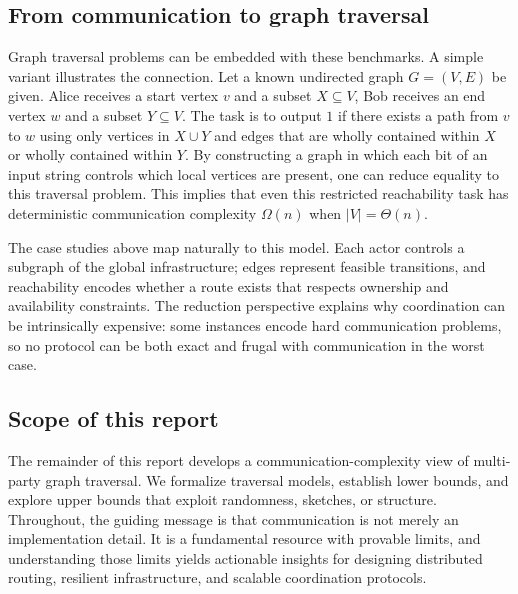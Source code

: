 \subsection{From communication to graph traversal}
Graph traversal problems can be embedded with these benchmarks. A simple variant illustrates the connection. Let a known undirected graph $G=(V,E)$ be given. Alice receives a start vertex $v$ and a subset $X\subseteq V$, Bob receives an end vertex $w$ and a subset $Y\subseteq V$. The task is to output $1$ if there exists a path from $v$ to $w$ using only vertices in $X\cup Y$ and edges that are wholly contained within $X$ or wholly contained within $Y$. By constructing a graph in which each bit of an input string controls which local vertices are present, one can reduce equality to this traversal problem. This implies that even this restricted reachability task has deterministic communication complexity $\Omega(n)$ when $|V|=\Theta(n)$.

The case studies above map naturally to this model. Each actor controls a subgraph of the global infrastructure; edges represent feasible transitions, and reachability encodes whether a route exists that respects ownership and availability constraints. The reduction perspective explains why coordination can be intrinsically expensive: some instances encode hard communication problems, so no protocol can be both exact and frugal with communication in the worst case.

\subsection{Scope of this report}
The remainder of this report develops a communication-complexity view of multi-party graph traversal. We formalize traversal models, establish lower bounds, and explore upper bounds that exploit randomness, sketches, or structure. Throughout, the guiding message is that communication is not merely an implementation detail. It is a fundamental resource with provable limits, and understanding those limits yields actionable insights for designing distributed routing, resilient infrastructure, and scalable coordination protocols.
